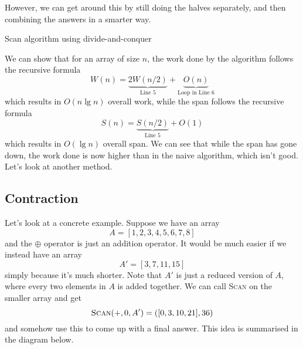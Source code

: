 \documentclass[12pt]{article}
\begin{document}
However, we can get around this by still doing the halves separately, and then combining the answers in a smarter way.
\begin{algorithm}[H]
	\caption{Scan algorithm using divide-and-conquer}
	\label{scdc}
	\begin{algorithmic}[1]
		\EndParFor
		\State {}
		\EndFunction
	\end{algorithmic}
\end{algorithm}
We can show that for an array of size $n$, the work done by the algorithm follows the recursive formula $$W(n) = \underbrace{2W(n/2) }_{\text{Line 5} }+ \underbrace{O(n)}_{\text{Loop in Line 6}}$$ which results in $O(n\lg n)$ overall work, while the span follows the recursive formula $$S(n) = \underbrace{S(n/2) }_{\text{Line 5} } + O(1)$$ which results in $O(\lg n)$ overall span. We can see that while the span has gone down, the work done is now higher than in the naive algorithm, which isn't good. Let's look at another method.

\subsection{Contraction}

Let's look at a concrete example. Suppose we have an array
$$A = [1, 2, 3, 4, 5, 6, 7, 8]$$
and the $\oplus$ operator is just an addition operator. It would be much easier if we instead have an array
$$A' = [3, 7, 11, 15]$$
simply because it's much shorter. Note that $A'$ is just a reduced version of $A$, where every two elements in $A$ is added together. We can call \textsc{Scan} on the smaller array and get
$$\textsc{Scan}(+, 0, A') = ([0, 3, 10, 21], 36)$$
and somehow use this to come up with a final answer. This idea is summarised in the diagram below.
\end{document}

